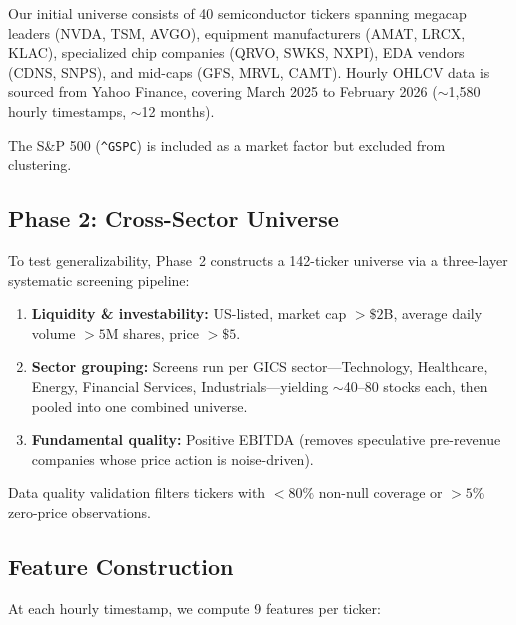 \documentclass[11pt, a4paper]{article}
\begin{document}
Our initial universe consists of 40 semiconductor tickers spanning megacap leaders (NVDA, TSM, AVGO), equipment manufacturers (AMAT, LRCX, KLAC), specialized chip companies (QRVO, SWKS, NXPI), EDA vendors (CDNS, SNPS), and mid-caps (GFS, MRVL, CAMT). Hourly OHLCV data is sourced from Yahoo Finance, covering March 2025 to February 2026 ($\sim$1,580 hourly timestamps, $\sim$12 months).

The S\&P 500 (\texttt{\^{}GSPC}) is included as a market factor but excluded from clustering.

\subsection{Phase 2: Cross-Sector Universe}

To test generalizability, Phase~2 constructs a 142-ticker universe via a three-layer systematic screening pipeline:

\begin{enumerate}
    \item \textbf{Liquidity \& investability:} US-listed, market cap $> \$2$B, average daily volume $> 5$M shares, price $> \$5$.
    \item \textbf{Sector grouping:} Screens run per GICS sector---Technology, Healthcare, Energy, Financial Services, Industrials---yielding $\sim$40--80 stocks each, then pooled into one combined universe.
    \item \textbf{Fundamental quality:} Positive EBITDA (removes speculative pre-revenue companies whose price action is noise-driven).
\end{enumerate}

Data quality validation filters tickers with $<80\%$ non-null coverage or $>5\%$ zero-price observations.

\subsection{Feature Construction}

At each hourly timestamp, we compute 9 features per ticker:
\end{document}
